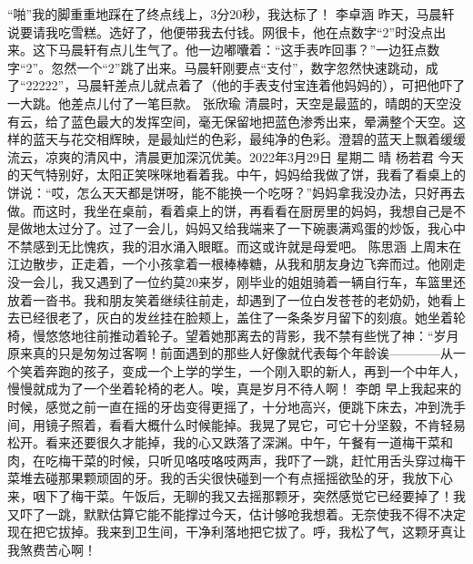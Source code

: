 {}“啪”我的脚重重地踩在了终点线上，3分20秒，我达标了！\markdownRendererInterblockSeparator
{}\markdownRendererInterblockSeparator
{}李卓涵\markdownRendererInterblockSeparator
{}昨天，马晨轩说要请我吃雪糕。选好了，他便带我去付钱。网很卡，他在点数字“2”时没点出来。这下马晨轩有点儿生气了。他一边嘟囔着：“这手表咋回事？”一边狂点数字“2”。忽然一个“2”跳了出来。马晨轩刚要点“支付”，数字忽然快速跳动，成了“22222”，马晨轩差点儿就点着了（他的手表支付宝连着他妈妈的），可把他吓了一大跳。他差点儿付了一笔巨款。\markdownRendererInterblockSeparator
{}\markdownRendererInterblockSeparator
{}张欣瑜\markdownRendererInterblockSeparator
{}清晨时，天空是最蓝的，晴朗的天空没有云，给了蓝色最大的发挥空间，毫无保留地把蓝色渗秀出来，晕满整个天空。这样的蓝天与花交相辉映，是最灿烂的色彩，最纯净的色彩。澄碧的蓝天上飘着缓缓流云，凉爽的清风中，清晨更加深沉优美。2022年3月29日 星期二 晴\markdownRendererInterblockSeparator
{}\markdownRendererInterblockSeparator
{}杨若君\markdownRendererInterblockSeparator
{}今天的天气特别好，太阳正笑咪咪地看着我。中午，妈妈给我做了饼，我看了看桌上的饼说：“哎，怎么天天都是饼呀，能不能换一个吃呀？”妈妈拿我没办法，只好再去做。而这时，我坐在桌前，看着桌上的饼，再看看在厨房里的妈妈，我想自己是不是做地太过分了。过了一会儿，妈妈又给我端来了一下碗裹满鸡蛋的炒饭，我心中不禁感到无比愧疚，我的泪水涌入眼眶。而这或许就是母爱吧。\markdownRendererInterblockSeparator
{}\markdownRendererInterblockSeparator
{}陈思涵\markdownRendererInterblockSeparator
{}上周末在江边散步，正走着，一个小孩拿着一根棒棒糖，从我和朋友身边飞奔而过。他刚走没一会儿，我又遇到了一位约莫20来岁，刚毕业的姐姐骑着一辆自行车，车篮里还放着一沓书。我和朋友笑着继续往前走，却遇到了一位白发苍苍的老奶奶，她看上去已经很老了，灰白的发丝挂在脸颊上，盖住了一条条岁月留下的刻痕。她坐着轮椅，慢悠悠地往前推动着轮子。望着她那离去的背影，我不禁有些恍了神：“岁月原来真的只是匆匆过客啊！前面遇到的那些人好像就代表每个年龄诶————从一个笑着奔跑的孩子，变成一个上学的学生，一个刚入职的新人，再到一个中年人，慢慢就成为了一个坐着轮椅的老人。唉，真是岁月不待人啊！\markdownRendererInterblockSeparator
{}\markdownRendererInterblockSeparator
{}李朗\markdownRendererInterblockSeparator
{}早上我起来的时候，感觉之前一直在摇的牙齿变得更摇了，十分地高兴，便跳下床去，冲到洗手间，用镜子照着，看看大概什么时候能掉。我晃了晃它，可它十分坚毅，不肯轻易松开。看来还要很久才能掉，我的心又跌落了深渊。中午，午餐有一道梅干菜和肉，在吃梅干菜的时候，只听见咯吱咯吱两声，我吓了一跳，赶忙用舌头穿过梅干菜堆去碰那果颗顽固的牙。我的舌尖很快碰到一个有点摇摇欲坠的牙，我放下心来，咽下了梅干菜。午饭后，无聊的我又去摇那颗牙，突然感觉它已经要掉了！我又吓了一跳，默默估算它能不能撑过今天，估计够呛我想着。无奈使我不得不决定现在把它拔掉。我来到卫生间，干净利落地把它拔了。呼，我松了气，这颗牙真让我煞费苦心啊！\markdownRendererInterblockSeparator

